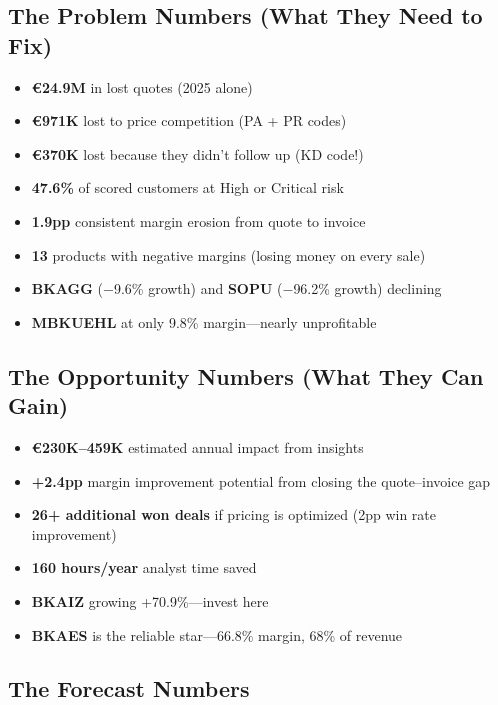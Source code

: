 \documentclass[11pt,a4paper]{article}
\newcommand{\EUR}{\euro{}}
\newcommand{\pp}{pp}
\begin{document}
\subsection{The Problem Numbers (What They Need to Fix)}

\begin{itemize}[nosep]
  \item \textbf{\EUR24.9M} in lost quotes (2025 alone)
  \item \textbf{\EUR971K} lost to price competition (PA + PR codes)
  \item \textbf{\EUR370K} lost because they didn't follow up (KD code!)
  \item \textbf{47.6\%} of scored customers at High or Critical risk
  \item \textbf{1.9\pp{}} consistent margin erosion from quote to invoice
  \item \textbf{13} products with negative margins (losing money on every sale)
  \item \textbf{BKAGG} ($-$9.6\% growth) and \textbf{SOPU} ($-$96.2\% growth) declining
  \item \textbf{MBKUEHL} at only 9.8\% margin---nearly unprofitable
\end{itemize}

\subsection{The Opportunity Numbers (What They Can Gain)}

\begin{itemize}[nosep]
  \item \textbf{\EUR230K--459K} estimated annual impact from insights
  \item \textbf{+2.4\pp{}} margin improvement potential from closing the quote--invoice gap
  \item \textbf{26+ additional won deals} if pricing is optimized (2\pp{} win rate improvement)
  \item \textbf{160 hours/year} analyst time saved
  \item \textbf{BKAIZ} growing +70.9\%---invest here
  \item \textbf{BKAES} is the reliable star---66.8\% margin, 68\% of revenue
\end{itemize}

\subsection{The Forecast Numbers}
\end{document}
